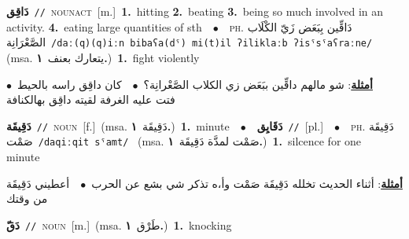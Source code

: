 \documentclass[10pt,a4paper,twoside]{article} %
\begin{document}
\begin{multicols}{2}
{\setlength\topsep{0pt}\textbf{\foreignlanguage{arabic}{دَاقِق}}\ {\color{gray}\texttt{//}\color{black}}\ \textsc{noun\textunderscore act}\ [m.]\ \textbf{1.}~hitting  \textbf{2.}~beating  \textbf{3.}~being so much involved in an activity.  \textbf{4.}~eating large quantities of sth\ \ $\bullet$\ \ \textsc{ph.} \color{gray} \foreignlanguage{arabic}{دَاقِّين بِبَعَض زَيّ الكْلَاب الصَّعْرَانِة}\color{black}\ {\color{gray}\texttt{/{\sffamily daː(q)(q)iːn bibaʕa(dˤ) mi(t)il ʔiliklaːb ʔisˤsˤaʕraːne}/}\color{black}}\ \color{gray} (msa. \foreignlanguage{arabic}{يتعارك بعنف}~\foreignlanguage{arabic}{\textbf{١.}})\color{black}\ \textbf{1.}~fight violently\  \begin{flushright}\color{gray}\foreignlanguage{arabic}{\textbf{\underline{\foreignlanguage{arabic}{أمثلة}}}: شو مالهم داقِّين ببَعَض زي الكلاب الصَّعْرانِة؟\ $\bullet$\ \  كان داقِق راسه بالحيط\ $\bullet$\ \  فتت عليه الغرفة لقيته داقِق بهالكنافة}\end{flushright}\color{black}} \vspace{2mm}

{\setlength\topsep{0pt}\textbf{\foreignlanguage{arabic}{دَقِيقَة}}\ {\color{gray}\texttt{//}\color{black}}\ \textsc{noun}\ [f.]\ \color{gray}(msa. \foreignlanguage{arabic}{دَقِيقَة}~\foreignlanguage{arabic}{\textbf{١.}})\color{black}\ \textbf{1.}~minute\ \ $\bullet$\ \ \setlength\topsep{0pt}\textbf{\foreignlanguage{arabic}{دَقَايِق}}\ {\color{gray}\texttt{//}\color{black}}\ [pl.]\ \ $\bullet$\ \ \textsc{ph.} \color{gray} \foreignlanguage{arabic}{دَقِيقَة صَمْت}\color{black}\ {\color{gray}\texttt{/{\sffamily daqiːqit sˤamt}/}\color{black}}\ \color{gray} (msa. \foreignlanguage{arabic}{صَمْت لمدَّة دَقِيقَة}~\foreignlanguage{arabic}{\textbf{١.}})\color{black}\ \textbf{1.}~silcence for one minute\  \begin{flushright}\color{gray}\foreignlanguage{arabic}{\textbf{\underline{\foreignlanguage{arabic}{أمثلة}}}: أثناء الحديث تخلله دَقِيقَة صَمْت وأ،ه تذكر شي بشع عن الحرب\ $\bullet$\ \  أعطيني دَقِيقَة من وقتك}\end{flushright}\color{black}} \vspace{2mm}

{\setlength\topsep{0pt}\textbf{\foreignlanguage{arabic}{دَقّ}}\ {\color{gray}\texttt{//}\color{black}}\ \textsc{noun}\ [m.]\ \color{gray}(msa. \foreignlanguage{arabic}{طَرْق}~\foreignlanguage{arabic}{\textbf{١.}})\color{black}\ \textbf{1.}~knocking\ } \vspace{2mm}


\end{multicols}
\end{document}
